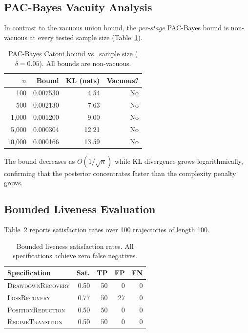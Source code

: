\documentclass[11pt]{article}
\begin{document}
\subsection{PAC-Bayes Vacuity Analysis}\label{sec:vacuity}

In contrast to the vacuous union bound, the \emph{per-stage} PAC-Bayes
bound is non-vacuous at every tested sample size
(Table~\ref{tab:vacuity}).

\begin{table}[t]
\centering
\caption{PAC-Bayes Catoni bound vs.\ sample size ($\delta{=}0.05$).
All bounds are non-vacuous.}\label{tab:vacuity}
\small
\begin{tabular}{@{}rrrr@{}}
\toprule
$n$ & \textbf{Bound} & \textbf{KL (nats)}
  & \textbf{Vacuous?} \\
\midrule
100      & 0.007530 &  4.54 & No \\
500      & 0.002130 &  7.63 & No \\
1{,}000  & 0.001200 &  9.00 & No \\
5{,}000  & 0.000304 & 12.21 & No \\
10{,}000 & 0.000166 & 13.59 & No \\
\bottomrule
\end{tabular}
\end{table}

The bound decreases as $O(1/\sqrt{n})$ while KL divergence grows
logarithmically, confirming that the posterior concentrates faster
than the complexity penalty grows.

\subsection{Bounded Liveness Evaluation}

Table~\ref{tab:livenesseval} reports satisfaction rates over 100
trajectories of length 100.

\begin{table}[t]
\centering
\caption{Bounded liveness satisfaction rates.  All specifications
achieve zero false negatives.}\label{tab:livenesseval}
\small
\begin{tabular}{@{}lrrrr@{}}
\toprule
\textbf{Specification} & \textbf{Sat.}
  & \textbf{TP} & \textbf{FP} & \textbf{FN} \\
\midrule
\textsc{DrawdownRecovery}  & 0.50 & 50 &  0 & 0 \\
\textsc{LossRecovery}      & 0.77 & 50 & 27 & 0 \\
\textsc{PositionReduction} & 0.50 & 50 &  0 & 0 \\
\textsc{RegimeTransition}  & 0.50 & 50 &  0 & 0 \\
\bottomrule
\end{tabular}
\end{table}
\end{document}
